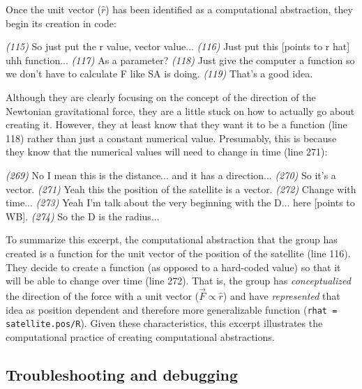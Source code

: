 \documentclass{msuphddissertation}
\begin{document}
\begin{doublespace}
Once the unit vector ($\hat{r}$) has been identified as a computational abstraction, they begin its creation in code:\begin{description}
\SD \textit{(115)} So just put the r value, vector value...
\SD \textit{(116)} Just put this [points to r hat] uhh function...
\SB \textit{(117)} As a parameter?			
\SD \textit{(118)} Just give the computer a function so we don't have to calculate F {like SA is doing}.	
\SB \textit{(119)} That's a good idea.
\end{description} Although they are clearly focusing on the concept of the direction of the Newtonian gravitational force, they are a little stuck on how to actually go about creating it.  However, they at least know that they want it to be a function (line 118) rather than just a constant numerical value.  Presumably, this is because they know that the numerical values will need to change in time (line 271):\begin{description}
\SD \textit{(269)} No I mean this is the distance... and it has a direction...	
\SB \textit{(270)} So it's a vector.
\SD \textit{(271)} Yeah this {the position of the satellite} is a vector.
\SD \textit{(272)} Change with time...
\SC \textit{(273)} Yeah I'm talk about the very beginning with the D... here [points to WB].
\SB \textit{(274)} So the D is the radius...
\end{description}

To summarize this excerpt, the computational abstraction that the group has created is a function for the unit vector of the position of the satellite (line 116).  They decide to create a function (as opposed to a hard-coded value) so that it will be able to change over time (line 272).  That is, the group has \textit{conceptualized} the direction of the force with a unit vector ($\vec{F}\propto\hat{r}$) and have \textit{represented} that idea as position dependent and therefore more generalizable function (\texttt{rhat = satellite.pos/R}).  Given these characteristics, this excerpt illustrates the computational practice of creating computational abstractions.

%
%
%
%
%
%
%
%
%
%
%
%
%
%
%
%

\subsection{Troubleshooting and debugging}\label{CH5:SecTroubleshootingAndDebugging}


\end{doublespace}
\end{document}

